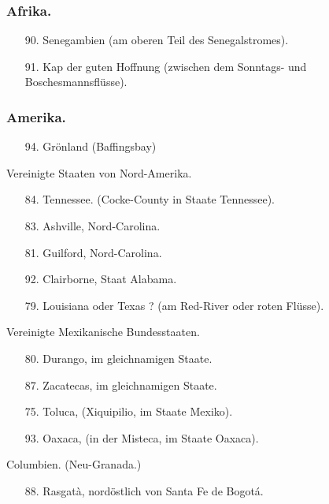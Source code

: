 \documentclass[a4paper, 11pt, oneside, polutonikogreek, german]{article}
\begin{document}
\subsubsection{Afrika.}
\begin{itemize}
    \small
    \item[90.] Senegambien (am oberen Teil des Senegalstromes).
    \item[91.] Kap der guten Hoffnung (zwischen dem Sonntags- und Boschesmannsflüsse).
\end{itemize}
\subsubsection{Amerika.}
\begin{itemize}
    \small
    \item[94.] Grönland (Baffingsbay)
\end{itemize}
\begin{center}
Vereinigte Staaten von Nord-Amerika.
\end{center}
\begin{itemize}
    \small
    \item[84.] Tennessee. (Cocke-County in Staate Tennessee).
    \item[83.] Ashville, Nord-Carolina.
    \item[81.] Guilford, Nord-Carolina.
    \item[92.] Clairborne, Staat Alabama.
    \item[79.] Louisiana oder Texas ? (am Red-River oder roten Flüsse). 
\end{itemize}
\begin{center}
Vereinigte Mexikanische Bundesstaaten.
\end{center}
\begin{itemize}
    \small
    \item[80.] Durango, im gleichnamigen Staate.
    \item[87.] Zacatecas, im gleichnamigen Staate.
    \item[75.] Toluca, (Xiquipilio, im Staate Mexiko).
    \item[93.] Oaxaca, (in der Misteca, im Staate Oaxaca).
\end{itemize}
\begin{center}
Columbien. (Neu-Granada.)
\end{center}
\begin{itemize}
    \small
    \item[88.] Rasgatà, nordöstlich von Santa Fe de Bogotá.
\end{itemize}
\end{document}
